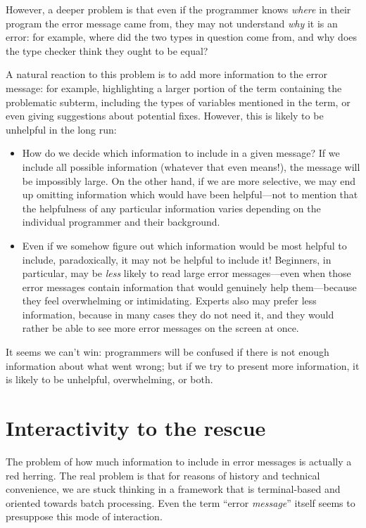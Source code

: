 \documentclass[sigplan, screen]{acmart}\settopmatter{printccs=false,printacmref=false}
\begin{document}
However, a deeper problem is that even if the programmer knows
\emph{where} in their program the error message came from, they may
not understand \emph{why} it is an error: for example, where
did the two types in question come from, and why does the type checker
think they ought to be equal?

A natural reaction to this problem is to add more information to the
error message: for example, highlighting a larger portion of the term
containing the problematic subterm, including the types of variables
mentioned in the term, or even giving suggestions about potential
fixes.  However, this is likely to be unhelpful in the long run:

\begin{itemize}
\item How do we decide which information to include in a given
  message?  If we include all possible information (whatever that even
  means!), the message will be impossibly large. On the other hand, if
  we are more selective, we may end up omitting information which
  would have been helpful---not to mention that the helpfulness of any
  particular information varies depending on the individual programmer
  and their background.
\item Even if we somehow figure out which information would be most
  helpful to include, paradoxically, it may not be helpful to include
  it!  Beginners, in particular, may be \emph{less} likely to read
  large error messages---even when those error messages contain
  information that would genuinely help them---because they feel
  overwhelming or intimidating. Experts also may prefer less
  information, because in many cases they do not need it, and they
  would rather be able to see more error messages on the screen at
  once.
\end{itemize}

It seems we can't win: programmers will be confused if there is not enough
information about what went wrong; but if we try to present more
information, it is likely to be unhelpful, overwhelming, or both.

\section{Interactivity to the rescue}

The problem of how much information to include in error messages is
actually a red herring.  The real problem is that for reasons of
history and technical convenience, we are stuck thinking in a
framework that is terminal-based and oriented towards batch
processing.  Even the term ``error \emph{message}'' itself seems to
presuppose this mode of interaction.
\end{document}
